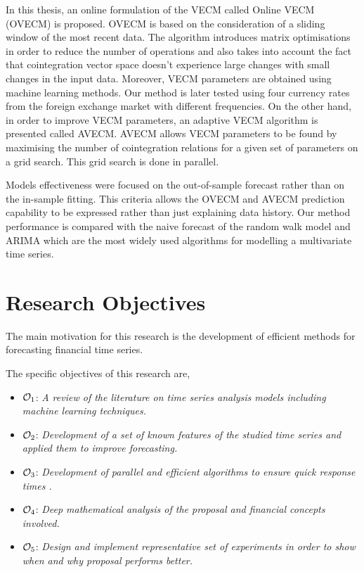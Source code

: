 In this thesis, an online formulation of the VECM called Online VECM (OVECM) is
proposed. OVECM is based on the consideration of a sliding window of the most
recent data.  The algorithm introduces matrix optimisations in order to reduce
the number of operations and also takes into account the fact that cointegration
vector space doesn't experience large changes with small changes in the input
data. Moreover, VECM parameters are obtained using machine learning methods. Our
method is later tested using four currency rates from the foreign exchange
market with different frequencies.  On the other hand, in order to improve VECM
parameters, an adaptive VECM algorithm is presented called AVECM. AVECM allows
VECM parameters to be found by maximising the number of cointegration relations
for a given set of parameters on a grid search. This grid search is done in
parallel.

Models effectiveness were focused on the out-of-sample forecast rather than on
the in-sample fitting. This criteria allows the OVECM and AVECM prediction
capability to be expressed rather than just explaining data history. Our method
performance is compared with the naive forecast of the random walk model and
ARIMA which are the most widely used algorithms for modelling a multivariate
time series.


\section{Research Objectives}
The main motivation for this research is the development of efficient methods
for forecasting financial time series.

The specific objectives of this research are,
\begin{itemize}
\item $\Large \mathcal{O}_1$: \emph{A review of the literature on time series
analysis models including machine learning techniques.}
\item $\Large \mathcal{O}_2$: \emph{Development of a set of known features of the
studied time series and applied them to improve forecasting.}
\item $\Large \mathcal{O}_3$: \emph{Development of parallel and efficient
algorithms to ensure quick response times .}
\item $\Large \mathcal{O}_4$: \emph{Deep mathematical analysis of the proposal
and financial concepts involved.}
\item $\Large \mathcal{O}_5$: \emph{Design and implement representative set of
experiments in order to show when and why proposal performs better.}
\end{itemize}


